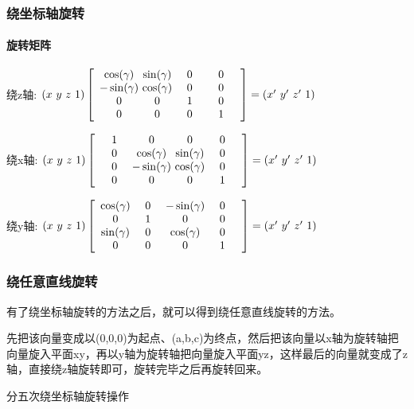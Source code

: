 \begin{frame}
\frametitle{绕坐标轴旋转}
\framesubtitle{旋转矩阵}
绕z轴:
$(x \ y \ z \ 1)
\left[
    \begin{array}{ c @{\ } c @{\ } c @{\ } c }
        \cos(\gamma)  & \sin(\gamma) & \ \ \ 0 \ \ \ & \ \ \ 0 \ \ \ \\
        -\sin(\gamma) & \cos(\gamma) & \ \ \ 0 \ \ \ & \ \ \ 0 \ \ \ \\
        0             & 0            & \ \ \ 1 \ \ \ & \ \ \ 0 \ \ \ \\
        0             & 0            & \ \ \ 0 \ \ \ & \ \ \ 1 \ \ \
    \end{array}
\right]
=(x' \ y' \ z' \ 1)$

绕x轴:
$(x \ y \ z \ 1)
\left[
    \begin{array}{ c @{\ } c @{\ } c @{\ } c }
       \ \ \ 1 \ \ \ & 0             & 0            & \ \ \ 0 \ \ \ \\
       \ \ \ 0 \ \ \ & \cos(\gamma)  & \sin(\gamma) & \ \ \ 0 \ \ \ \\
       \ \ \ 0 \ \ \ & -\sin(\gamma) & \cos(\gamma) & \ \ \ 0 \ \ \ \\
       \ \ \ 0 \ \ \ & 0             & 0            & \ \ \ 1 \ \ \
    \end{array}
\right]
=(x' \ y' \ z' \ 1)$

绕y轴:
$(x \ y \ z \ 1)
\left[
    \begin{array}{ c @{\ } c @{\ } c @{\ } c }
        \cos(\gamma)  & \ \ \ 0 \ \ \ & -\sin(\gamma) & \ \ \ 0 \ \ \ \\
        0             & \ \ \ 1 \ \ \ & 0             & \ \ \ 0 \ \ \ \\
        \sin(\gamma)  & \ \ \ 0 \ \ \ & \cos(\gamma)  & \ \ \ 0 \ \ \ \\
        0             & \ \ \ 0 \ \ \ & 0             & \ \ \ 1 \ \ \
    \end{array}
\right]
=(x' \ y' \ z' \ 1)$

\end{frame}

\begin{frame}
\frametitle{绕任意直线旋转}
\pause
有了绕坐标轴旋转的方法之后，就可以得到绕任意直线旋转的方法。\newline \newline

\pause
先把该向量变成以(0,0,0)为起点、(a,b,c)为终点，然后把该向量以x轴为旋转轴把向量旋入平面xy，再以y轴为旋转轴把向量旋入平面yz，这样最后的向量就变成了z轴，直接绕z轴旋转即可，旋转完毕之后再旋转回来。\newline \newline

\pause
分五次绕坐标轴旋转操作
\end{frame}

